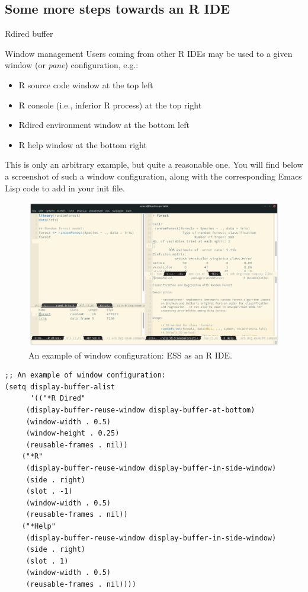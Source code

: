 \documentclass[presentation]{beamer}
\begin{document}
\subsection{Some more steps towards an R IDE}
\label{sec:orgdc9575d}
\begin{frame}[label={sec:org2bb2a17}]{Rdired buffer}
\end{frame}

\begin{frame}[fragile,allowframebreaks,label=]{Window management}
 Users coming from other R IDEs may be used to a given window (or \emph{pane}) configuration, e.g.:
\begin{itemize}
\item R source code window at the top left
\item R console (i.e., inferior R process) at the top right
\item Rdired environment window at the bottom left
\item R help window at the bottom right
\end{itemize}

This is only an arbitrary example, but quite a reasonable one. You will find below a screenshot of such a window configuration, along with the corresponding Emacs Lisp code to add in your init file.

\pagebreak

\begin{figure}[htbp]
\centering
\includegraphics[width=0.96 \textwidth]{./images/window_config.png}
\caption{\label{fig:org351709e}An example of window configuration: ESS as an R IDE.}
\end{figure}

\pagebreak

\begin{verbatim}
;; An example of window configuration:
(setq display-buffer-alist
      '(("*R Dired"
	 (display-buffer-reuse-window display-buffer-at-bottom)
	 (window-width . 0.5)
	 (window-height . 0.25)
	 (reusable-frames . nil))
	("*R"
	 (display-buffer-reuse-window display-buffer-in-side-window)
	 (side . right)
	 (slot . -1)
	 (window-width . 0.5)
	 (reusable-frames . nil))
	("*Help"
	 (display-buffer-reuse-window display-buffer-in-side-window)
	 (side . right)
	 (slot . 1)
	 (window-width . 0.5)
	 (reusable-frames . nil))))
\end{verbatim}
\end{frame}
\end{document}

